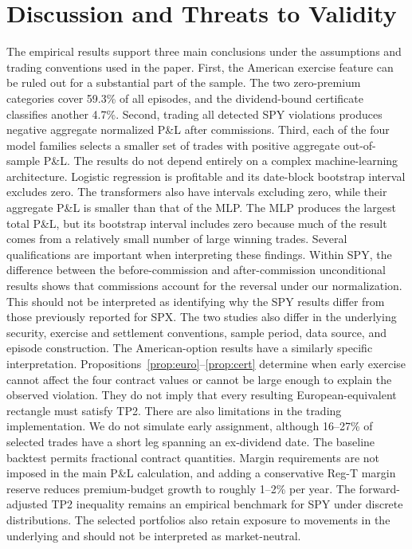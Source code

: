 \documentclass[sigconf,review,anonymous]{acmart}
\begin{document}
\section{Discussion and Threats to Validity}
\label{sec:limitations}
The empirical results support three main conclusions under the assumptions and trading conventions used in the paper. First, the American exercise feature can be ruled out for a substantial part of the sample. The two zero-premium categories cover 59.3\% of all episodes, and the dividend-bound certificate classifies another 4.7\%. Second, trading all detected SPY violations produces negative aggregate normalized P\&L after commissions. Third, each of the four model families selects a smaller set of trades with positive aggregate out-of-sample P\&L.
The results do not depend entirely on a complex machine-learning architecture. Logistic regression is profitable and its date-block bootstrap interval excludes zero. The transformers also have intervals excluding zero, while their aggregate P\&L is smaller than that of the MLP. The MLP produces the largest total P\&L, but its bootstrap interval includes zero because much of the result comes from a relatively small number of large winning trades.
Several qualifications are important when interpreting these findings. Within SPY, the difference between the before-commission and after-commission unconditional results shows that commissions account for the reversal under our normalization. This should not be interpreted as identifying why the SPY results differ from those previously reported for SPX. The two studies also differ in the underlying security, exercise and settlement conventions, sample period, data source, and episode construction.
The American-option results have a similarly specific interpretation. Propositions~\ref{prop:euro}--\ref{prop:cert} determine when early exercise cannot affect the four contract values or cannot be large enough to explain the observed violation. They do not imply that every resulting European-equivalent rectangle must satisfy TP2.
There are also limitations in the trading implementation. We do not simulate early assignment, although 16--27\% of selected trades have a short leg spanning an ex-dividend date. The baseline backtest permits fractional contract quantities. Margin requirements are not imposed in the main P\&L calculation, and adding a conservative Reg-T margin reserve reduces premium-budget growth to roughly 1--2\% per year. The forward-adjusted TP2 inequality remains an empirical benchmark for SPY under discrete distributions. The selected portfolios also retain exposure to movements in the underlying and should not be interpreted as market-neutral.
\end{document}
